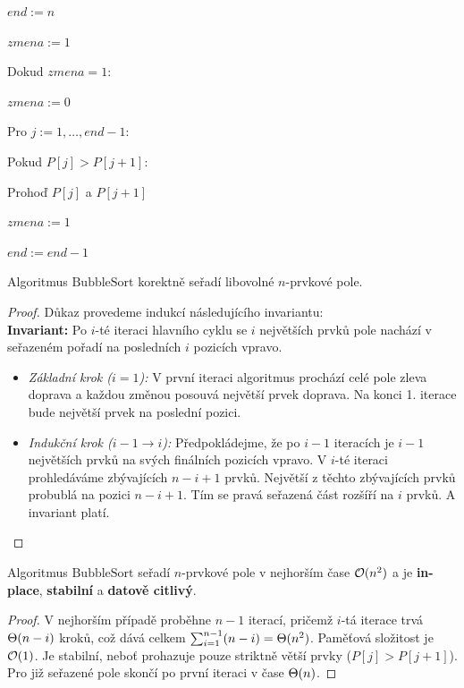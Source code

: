 \bigskip
{}
\begin{pseudocode}
\item $end := n$
\item $zmena := 1$
\item Dokud $zmena = 1$:
\item \tab $zmena := 0$
\item \tab Pro $j := 1, \dots, end - 1$:
\item \tab \tab Pokud $P[j] > P[j+1]$:
\item \tab \tab \tab Prohoď $P[j]$ a $P[j+1]$
\item \tab \tab \tab $zmena := 1$
\item \tab $end := end - 1$
\end{pseudocode}

\bigskip

\begin{theorem}
Algoritmus $\text{BubbleSort}$ korektně seřadí libovolné $n$-prvkové pole.
\end{theorem}

\begin{proof}
Důkaz provedeme indukcí následujícího invariantu: \\
\noindent\textbf{Invariant:} Po $i$-té iteraci hlavního cyklu se $i$ největších prvků pole nachází v seřazeném pořadí na posledních $i$ pozicích vpravo.
\begin{itemize}
    \item \textit{Základní krok ($i = 1$):} V první iteraci algoritmus prochází celé pole zleva doprava a každou změnou posouvá největší prvek doprava. Na konci 1. iterace bude největší prvek na poslední pozici.
    \item \textit{Indukční krok ($i - 1 \to i$):} Předpokládejme, že po $i - 1$ iteracích je $i - 1$ největších prvků na svých finálních pozicích vpravo. V $i$-té iteraci prohledáváme zbývajících $n - i + 1$ prvků. Největší z těchto zbývajících prvků probublá na pozici $n - i + 1$. Tím se pravá seřazená část rozšíří na $i$ prvků. A invariant platí.
\end{itemize}
\end{proof}

\begin{theorem}
Algoritmus $\text{BubbleSort}$ seřadí $n$-prvkové pole v nejhorším čase $\mathcal{O}(n^2)$ a je \textbf{in-place}, \textbf{stabilní} a \textbf{datově citlivý}.
\end{theorem}

\begin{proof}
V nejhorším případě proběhne $n - 1$ iterací, pričemž $i$-tá iterace trvá $\Theta(n - i)$ kroků, což dává celkem $\sum_{i=1}^{n-1} (n - i) = \Theta(n^2)$. Paměťová složitost je $\mathcal{O}(1)$. Je stabilní, neboť prohazuje pouze striktně větší prvky ($P[j] > P[j+1]$). Pro již seřazené pole skončí po první iteraci v čase $\Theta(n)$.
\end{proof}

